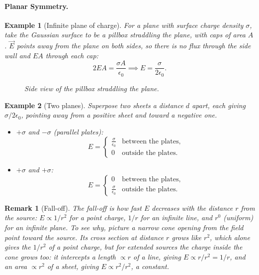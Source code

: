\documentclass{article}
\newtheorem*{example}{Example}
\newtheorem{remark}{Remark}
\begin{document}
\paragraph{Planar Symmetry.}
\begin{example}[Infinite plane of charge]
    For a plane with surface charge density $\sigma$, take the Gaussian surface to be a pillbox straddling the plane, with caps of area $A$. $\vec{E}$ points away from the plane on both sides, so there is no flux through the side wall and $EA$ through each cap:
    \[2EA = \frac{\sigma A}{\epsilon_0} \implies E = \frac{\sigma}{2\epsilon_0}.\]
    \begin{figure}[H]
        \centering
        \caption{Side view of the pillbox straddling the plane.}
    \end{figure}
\end{example}
\begin{example}[Two planes]
    Superpose two sheets a distance $d$ apart, each giving $\sigma/2\epsilon_0$, pointing away from a positive sheet and toward a negative one.
    \begin{itemize}
        \item $+\sigma$ and $-\sigma$ (parallel plates):
            \[E = \begin{cases}\frac{\sigma}{\epsilon_0} & \text{between the plates}, \\ 0 & \text{outside the plates}.\end{cases}\]
        \item $+\sigma$ and $+\sigma$: 
            \[E = \begin{cases}0 & \text{between the plates}, \\ \frac{\sigma}{\epsilon_0} & \text{outside the plates}.\end{cases}\]
    \end{itemize}
\end{example}
\begin{remark}[Fall-off]
    The fall-off is how fast $E$ decreases with the distance $r$ from the source: $E \propto 1/r^2$ for a point charge, $1/r$ for an infinite line, and $r^0$ (uniform) for an infinite plane. To see why, picture a narrow cone opening from the field point toward the source. Its cross section at distance $r$ grows like $r^2$, which alone gives the $1/r^2$ of a point charge, but for extended sources the charge inside the cone grows too: it intercepts a length $\propto r$ of a line, giving $E \propto r/r^2 = 1/r$, and an area $\propto r^2$ of a sheet, giving $E \propto r^2/r^2$, a constant.
\end{remark}
\end{document}
